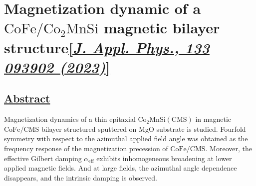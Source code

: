 \section{Magnetization dynamic of a $\mathrm{CoFe/Co_2MnSi}$ magnetic bilayer structure\href{https://doi.org/10.1063/5.0128519}{[\textit{J. Appl. Phys., 133 093902 (2023)}]}}


\subsection*{\underline{Abstract}}
Magnetization dynamics of a thin epitaxial $\mathrm{Co_2MnSi(CMS)}$ in magnetic $\mathrm{CoFe/CMS}$ bilayer structured sputtered on MgO substrate is studied. Fourfold symmetry with respect to the azimuthal applied field angle was obtained as the frequency response of the magnetization precession of $\mathrm{CoFe/CMS}$. Moreover, the effective Gilbert damping $\alpha_{\mathrm{eff}}$ exhibits inhomogeneous broadening at lower applied magnetic fields. And at large fields, the azimuthal angle dependence disappears, and the intrinsic damping is observed. 


